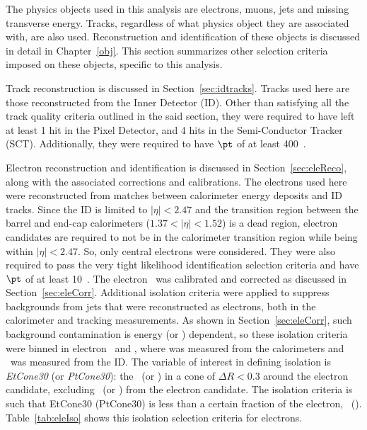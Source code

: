 \par The physics objects used in this analysis are electrons, muons, jets and missing 
transverse energy. Tracks, regardless of what physics object they are associated with, 
are also used. Reconstruction and identification of these objects is discussed in detail 
in Chapter~\ref{obj}. This section summarizes other selection criteria imposed on these 
objects, specific to this analysis. 

\par Track reconstruction is discussed in Section~\ref{sec:idtracks}. Tracks used here are those 
reconstructed from the Inner Detector (ID). Other than satisfying all the track quality criteria 
outlined in the said section, they were required to have left at least 1 hit in the Pixel 
Detector, and 4 hits in the Semi-Conductor Tracker (SCT). Additionally, they were required to have 
$\pt$ of at least 400~\MeV. 

\par Electron reconstruction and identification is discussed in Section~\ref{sec:eleReco}, along with 
the associated corrections and calibrations. The electrons used here were reconstructed from matches between 
calorimeter energy deposits and ID tracks. Since the ID is limited to $|\eta|<2.47$ and the transition region 
between the barrel and end-cap calorimeters ($1.37<|\eta|<1.52$) is a dead region, electron candidates are required 
to not be in the calorimeter transition region while being within $|\eta|<2.47$. So, only central electrons 
were considered. They were also required to pass the very tight likelihood identification selection 
criteria and have $\pt$ of at least 10~\GeV. The electron \pt\ was calibrated and 
corrected as discussed in Section~\ref{sec:eleCorr}. Additional isolation criteria were applied to suppress 
backgrounds from jets that were reconstructed as electrons, both in the calorimeter and tracking 
measurements. As shown in Section~\ref{sec:eleCorr}, such background contamination is energy (or \pt) 
dependent, so these isolation criteria were binned in electron \eT\ and \pt, where \eT was measured 
from the calorimeters and \pt\ was measured from the ID. The variable of interest in defining isolation is 
{\it EtCone30} (or {\it PtCone30}): the \eT\ (or \pt) in a cone of $\Delta R<0.3$ around the electron candidate, excluding 
\eT\ (or \pt) from the electron candidate. The isolation criteria is such that EtCone30 (PtCone30) is less 
than a certain fraction of the electron, \eT\ (\pt). Table~\ref{tab:eleIso} shows this isolation selection criteria 
for electrons. 

